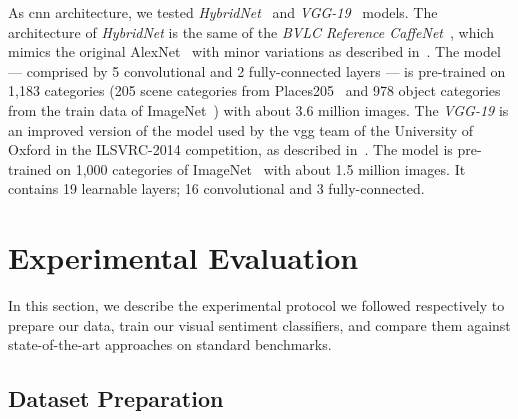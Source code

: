 As \gls{cnn} architecture, we tested \emph{HybridNet}~\cite{zhou2014learning} and \emph{VGG-19}~\cite{simonyan2014very} models.
The architecture of \emph{HybridNet} is the same of the \emph{BVLC Reference CaffeNet}~\cite{jia2014caffe}, which mimics the original AlexNet~\cite{krizhevsky2012imagenet} with minor variations as described in~\cite{zhou2014learning}.
The model --- comprised by 5 convolutional and 2 fully-connected layers --- is pre-trained on 1,183 categories (205 scene categories from Places205~\cite{zhou2014learning} and 978 object categories from the train data of ImageNet~\cite{russakovsky2015imagenet}) with about 3.6 million images.
The \emph{VGG-19} is an improved version of the model used by the \gls{vgg} team of the University of Oxford in the ILSVRC-2014 competition, as described in~\cite{simonyan2014very}.
The model is pre-trained on 1,000 categories of ImageNet~\cite{russakovsky2015imagenet} with about 1.5 million images.
It contains 19 learnable layers; 16 convolutional and 3 fully-connected.

\section{Experimental Evaluation}
\label{sec:vsa:experiments}

In this section, we describe the experimental protocol we followed respectively to prepare our data, train our visual sentiment classifiers, and compare them against state-of-the-art approaches on standard benchmarks.

\subsection{Dataset Preparation}

